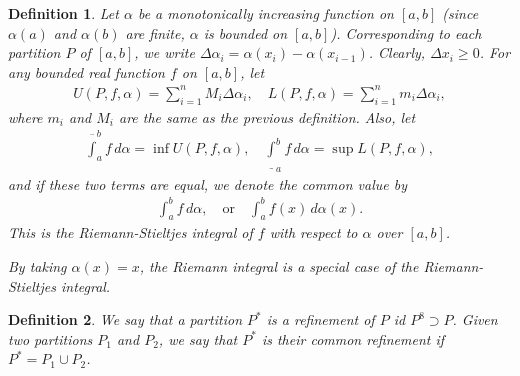 \documentclass[10pt]{book}
\newtheorem{definition}{Definition}[chapter]
\theoremstyle{definition}
\numberwithin{equation}{chapter}
\begin{document}
\begin{definition}
Let $\alpha$ be a monotonically increasing function on $[a,b]$ (since $\alpha(a)$ and $\alpha(b)$ are finite, $\alpha$ is bounded on $[a,b]$). Corresponding to each partition $P$ of $[a,b]$, we write $\Delta \alpha_i = \alpha(x_i) - \alpha(x_{i-1})$. Clearly, $\Delta x_i \geq 0$. For any bounded real function $f$ on $[a,b]$, let
\begin{align*}
    U(P,f,\alpha) = \sum^n_{i=1} M_i \Delta \alpha_i, \quad L(P,f,\alpha) = \sum^n_{i=1} m_i \Delta \alpha_i,
\end{align*}
where $m_i$ and $M_i$ are the same as the previous definition. Also, let
\begin{align*}
    \overline{\int}^b_a f \,d\alpha = \inf U(P,f,\alpha), \quad \underline{\int}^b_a f \,d\alpha = \sup L(P,f,\alpha),
\end{align*}
and if these two terms are equal, we denote the common value by
\begin{align*}
    \int^b_a f \,d\alpha, \quad \text{or} \quad \int^b_a f(x) \,d\alpha(x).
\end{align*}
This is the Riemann-Stieltjes integral of $f$ with respect to $\alpha$ over $[a,b]$. 

By taking $\alpha(x) = x$, the Riemann integral is a special case of the Riemann-Stieltjes integral. 
\end{definition}

\medskip

\begin{definition}
We say that a partition $P^*$ is a refinement of $P$ id $P^8 \supset P$. Given two partitions $P_1$ and $P_2$, we say that $P^*$ is their common refinement if $P^* = P_1 \cup P_2$.
\end{definition}


\medskip
\end{document}
